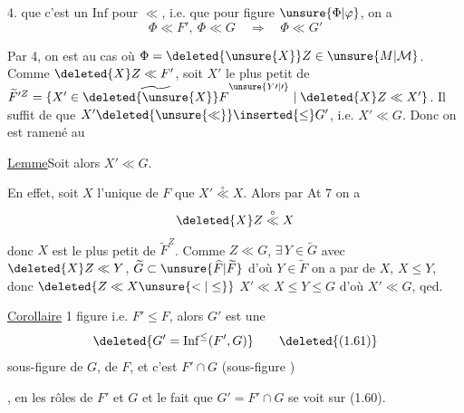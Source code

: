  4.  que c'est un $\mathrm{Inf}$ pour
$\ll$, i.e. que pour  figure $\unsure{\Phi|\varphi}$, on a
\[
\Phi\ll F',\ \Phi\ll G\quad\Longrightarrow\quad\Phi\ll G'
\]

Par  4, on est  au cas
où $\Phi=\deleted{\unsure{X}}Z\in\unsure{M|\mathcal{M}}$. Comme
$\deleted{X}Z\ll F'$, soit $X'$ le plus petit 
de $\widetilde F^{\prime Z}=\{X'\in\widetilde{\deleted{\unsure{X}}F}^{\unsure{Y\prime|\prime}}\mid\deleted{X}Z\ll X'\}$. Il
suffit de  que $X'\deleted{\unsure{\ll}}\inserted{\leq}G'$, i.e.
$X'\ll G$. Donc on est ramené au

\uline{Lemme}\qquad Soit
alors  $X'\ll G$.

En effet, soit $X$ l'unique  de $F$ 
que $X'\overset{\circ}{\ll}X$. Alors par At 7 on a
\[
\deleted{X}Z\overset{\circ}{\ll}X
\]
donc $X$ est le plus petit  de
$\widetilde F^{Z}$. Comme $Z\ll G$, $\exists\,Y\in\widetilde G$ avec
$\deleted{X}Z\ll Y$,     $\widetilde G\subset\unsure{\widehat F|\widetilde F}$ d'où $Y\in\widetilde F$
on a par  de $X$, $X\leq Y$, 
donc $\deleted{Z\ll X\unsure{<|\leq}}$  $X'\ll X\leq Y\leq G$
d'où $X'\ll G$, qed.

\noindent\llap{\smash{\rule[-4.8\baselineskip]{0.4pt}{4.2\baselineskip}}\enspace}\uline{Corollaire} 1\quad {}
figure i.e. $F'\leq F$, alors $G'$ est une
\[
\deleted{G'=\mathrm{Inf}^{\leq}(F',G)}\tag*{\deleted{(1.61)}}
\]
sous-figure de $G$,  de $F$, et
c'est $F'\cap G$ (sous-figure )

, en  les rôles de
$F'$ et $G$ \unsure{--} et le fait que $G'=F'\cap G$
se voit sur (1.60).

